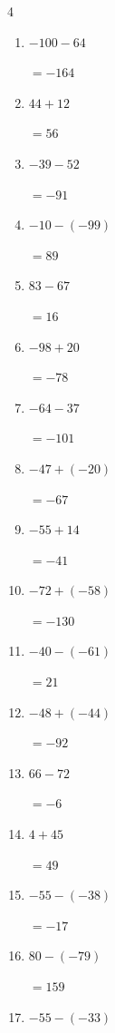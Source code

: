 \begin{multicols}{4}
\begin{enumerate}
        $=128$

  \item $-100-64$

        $=-164$

  \item $44+12$

        $=56$

  \item $-39-52$

        $=-91$

  \item $-10-(-99)$

        $=89$

  \item $83-67$

        $=16$

  \item $-98+20$

        $=-78$

  \item $-64-37$

        $=-101$

  \item $-47+(-20)$

        $=-67$

  \item $-55+14$

        $=-41$

  \item $-72+(-58)$

        $=-130$

  \item $-40-(-61)$

        $=21$

  \item $-48+(-44)$

        $=-92$

  \item $66-72$

        $=-6$

  \item $4+45$

        $=49$

  \item $-55-(-38)$

        $=-17$

  \item $80-(-79)$

        $=159$

  \item $-55-(-33)$


\end{enumerate}
\end{multicols}
